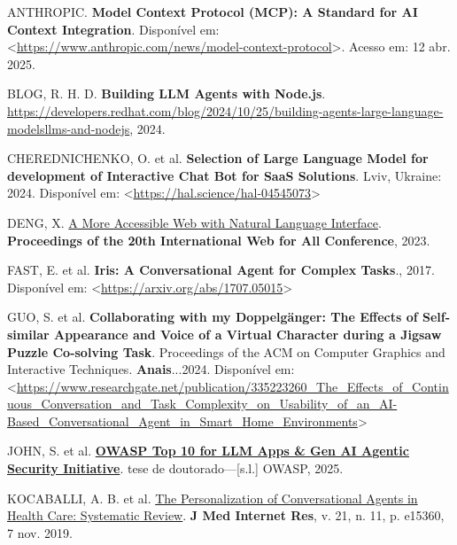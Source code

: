 \documentclass[
]{article}
\newlength{\cslhangindent}
\newenvironment{CSLReferences}[2] %
 {\begin{list}{}{%
  \setlength{\itemindent}{0pt}
  \setlength{\leftmargin}{0pt}
  \setlength{\parsep}{0pt}
  \ifodd #1
   \setlength{\leftmargin}{\cslhangindent}
   \setlength{\itemindent}{-1\cslhangindent}
  \fi
  \setlength{\itemsep}{#2\baselineskip}}}
 {\end{list}}
\begin{document}
\label{refs}
\begin{CSLReferences}{0}{1}
ANTHROPIC. \textbf{Model Context Protocol (MCP): A Standard for AI
Context Integration}. Disponível em:
\textless{}\url{https://www.anthropic.com/news/model-context-protocol}\textgreater.
Acesso em: 12 abr. 2025.

BLOG, R. H. D. \textbf{Building LLM Agents with Node.js}.
\url{https://developers.redhat.com/blog/2024/10/25/building-agents-large-language-modelsllms-and-nodejs},
2024.

CHEREDNICHENKO, O. et al. \textbf{Selection of Large Language Model for
development of Interactive Chat Bot for SaaS Solutions}. Lviv, Ukraine:
2024. Disponível em:
\textless{}\url{https://hal.science/hal-04545073}\textgreater{}

DENG, X. \href{https://api.semanticscholar.org/CorpusID:258259387}{A
More Accessible Web with Natural Language Interface}.
\textbf{Proceedings of the 20th International Web for All Conference},
2023.

FAST, E. et al. \textbf{Iris: A Conversational Agent for Complex
Tasks}., 2017. Disponível em:
\textless{}\url{https://arxiv.org/abs/1707.05015}\textgreater{}

GUO, S. et al. \textbf{Collaborating with my Doppelgänger: The Effects
of Self-similar Appearance and Voice of a Virtual Character during a
Jigsaw Puzzle Co-solving Task}. Proceedings of the ACM on Computer
Graphics and Interactive Techniques. \textbf{Anais}...2024. Disponível
em:
\textless{}\url{https://www.researchgate.net/publication/335223260_The_Effects_of_Continuous_Conversation_and_Task_Complexity_on_Usability_of_an_AI-Based_Conversational_Agent_in_Smart_Home_Environments}\textgreater{}

JOHN, S. et al.
\textbf{\href{https://genai.owasp.org/llmrisk/llm01-prompt-injection}{OWASP
Top 10 for LLM Apps \& Gen AI Agentic Security Initiative}}. tese de
doutorado---{[}s.l.{]} OWASP, 2025.

KOCABALLI, A. B. et al. \href{https://doi.org/10.2196/15360}{The
Personalization of Conversational Agents in Health Care: Systematic
Review}. \textbf{J Med Internet Res}, v. 21, n. 11, p. e15360, 7 nov.
2019.


\end{CSLReferences}
\end{document}
